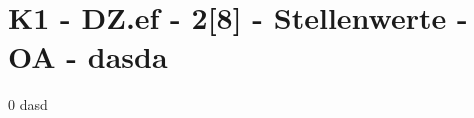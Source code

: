 \section{K1 - DZ.ef - 2[8] - Stellenwerte - OA - dasda}

\begin{langesbeispiel}\item[0] %
dasd

\end{langesbeispiel}